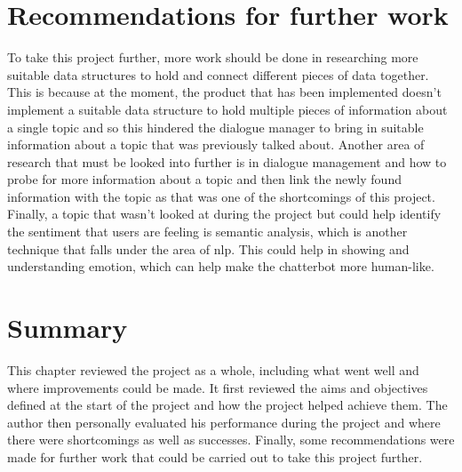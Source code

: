 \section{Recommendations for further work}
To take this project further, more work should be done in researching more suitable data structures to hold and connect different pieces of data together. This is because at the moment, the product that has been implemented doesn't implement a suitable data structure to hold multiple pieces of information about a single topic and so this hindered the dialogue manager to bring in suitable information about a topic that was previously talked about. Another area of research that must be looked into further is in dialogue management and how to probe for more information about a topic and then link the newly found information with the topic as that was one of the shortcomings of this project. Finally, a topic that wasn't looked at during the project but could help identify the sentiment that users are feeling is semantic analysis, which is another technique that falls under the area of \gls{nlp}. This could help in showing and understanding emotion, which can help make the chatterbot more human-like.
\section{Summary}
This chapter reviewed the project as a whole, including what went well and where improvements could be made. It first reviewed the aims and objectives defined at the start of the project and how the project helped achieve them. The author then personally evaluated his performance during the project and where there were shortcomings as well as successes. Finally, some recommendations were made for further work that could be carried out to take this project further.
